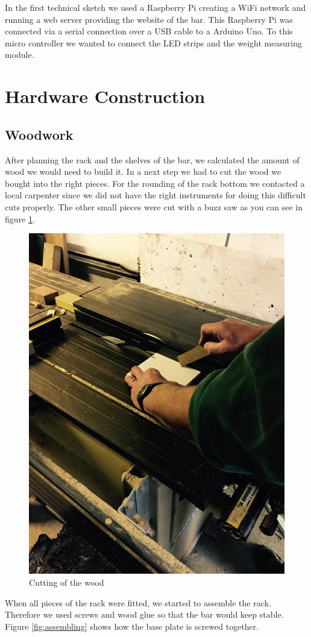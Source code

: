 \documentclass{acm_proc_article-sp}
\begin{document}
In the first technical sketch we used a Raspberry Pi creating a WiFi network and running a web server providing the website of the bar. This Raspberry Pi was connected via a serial connection over a USB cable to a Arduino Uno. To this micro controller we wanted to connect the LED strips and the weight measuring module.

\section{Hardware Construction}
\subsection{Woodwork}
After planning the rack and the shelves of the bar, we calculated the amount of wood we would need to build it. In a next step we had to cut the wood we bought into the right pieces. For the rounding of the rack bottom we contacted a local carpenter since we did not have the right instruments for doing this difficult cuts properly. The other small pieces were cut with a buzz saw as you can see in figure \ref{fig:cutting_wood}.

\begin{figure}[htbp] 
  \centering
     \includegraphics[width=0.5\linewidth]{pictures/cutting_wood.jpg}
  \caption{Cutting of the wood}
  \label{fig:cutting_wood}
\end{figure}

When all pieces of the rack were fitted, we started to assemble the rack. Therefore we used screws and wood glue so that the bar would keep stable. Figure \ref{fig:assembling} shows how the base plate is screwed together.
\end{document}

